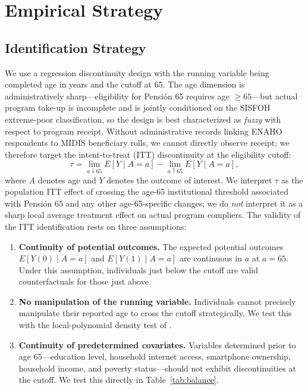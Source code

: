 \documentclass[12pt]{article}
\begin{document}
\section{Empirical Strategy}
\label{sec:strategy}

\subsection{Identification Strategy}

We use a regression discontinuity design with the running variable being completed age in years and the cutoff at 65. The age dimension is administratively sharp---eligibility for Pensi\'on 65 requires age $\ge 65$---but actual program take-up is incomplete and is jointly conditioned on the SISFOH extreme-poor classification, so the design is best characterized as \emph{fuzzy} with respect to program receipt. Without administrative records linking ENAHO respondents to MIDIS beneficiary rolls, we cannot directly observe receipt; we therefore target the intent-to-treat (ITT) discontinuity at the eligibility cutoff:
\begin{equation}
\tau = \lim_{a \downarrow 65} E[Y \mid A = a] - \lim_{a \uparrow 65} E[Y \mid A = a],
\label{eq:itt}
\end{equation}
where $A$ denotes age and $Y$ denotes the outcome of interest. We interpret $\tau$ as the population ITT effect of crossing the age-65 institutional threshold associated with Pensi\'on 65 and any other age-65-specific changes; we do \emph{not} interpret it as a sharp local average treatment effect on actual program compliers. The validity of the ITT identification rests on three assumptions:

\begin{enumerate}
    \item \textbf{Continuity of potential outcomes.} The expected potential outcomes $E[Y(0) \mid A = a]$ and $E[Y(1) \mid A = a]$ are continuous in $a$ at $a = 65$. Under this assumption, individuals just below the cutoff are valid counterfactuals for those just above.
    \item \textbf{No manipulation of the running variable.} Individuals cannot precisely manipulate their reported age to cross the cutoff strategically. We test this with the local-polynomial density test of \citet{cattaneo2018}.
    \item \textbf{Continuity of predetermined covariates.} Variables determined prior to age 65---education level, household internet access, smartphone ownership, household income, and poverty status---should not exhibit discontinuities at the cutoff. We test this directly in Table~\ref{tab:balance}.
\end{enumerate}
\end{document}
